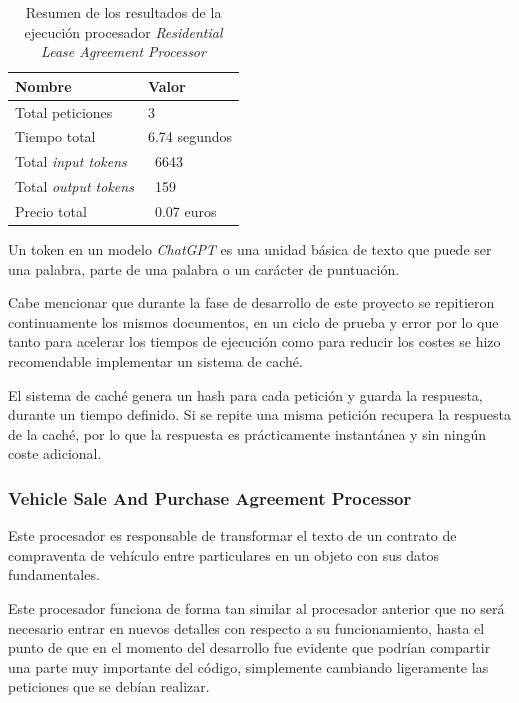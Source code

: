 \begin{table}[h]
    \renewcommand{\arraystretch}{1.5}
    \setlength{\tabcolsep}{10pt}
    \begin{tabular}{p{} p{}}
        \toprule
        \textbf{Nombre}              & \textbf{Valor} \\
        \midrule
        Total peticiones             & 3              \\
        Tiempo total                 & 6.74 segundos  \\
        Total \textit{input tokens}  & ~6643          \\
        Total \textit{output tokens} & ~159           \\
        Precio total                 & ~0.07 euros    \\
        \bottomrule
    \end{tabular}
    \caption{Resumen de los resultados de la ejecución procesador \textit{Residential Lease Agreement Processor}}
    \label{tab:residential_lease_processor}
\end{table}

Un token en un modelo \textit{ChatGPT} es una unidad básica de texto que puede ser una palabra, parte de una palabra
o un carácter de puntuación.

Cabe mencionar que durante la fase de desarrollo de este proyecto se repitieron continuamente los mismos documentos,
en un ciclo de prueba y error por lo que tanto para acelerar los tiempos de ejecución como para reducir los costes se
hizo recomendable implementar un sistema de caché.

El sistema de caché genera un hash para cada petición y guarda la respuesta, durante un tiempo definido.
Si se repite una misma petición recupera la respuesta de la caché, por lo que la respuesta es prácticamente
instantánea y sin ningún coste adicional.

\subsubsection*{Vehicle Sale And Purchase Agreement Processor}

Este procesador es responsable de transformar el texto de un contrato de compraventa de vehículo entre particulares en
un objeto con sus datos fundamentales.

Este procesador funciona de forma tan similar al procesador anterior que no será necesario entrar en nuevos detalles
con respecto a su funcionamiento, hasta el punto de que en el momento del desarrollo fue evidente que podrían
compartir una parte muy importante del código, simplemente cambiando ligeramente las peticiones que se debían realizar.

